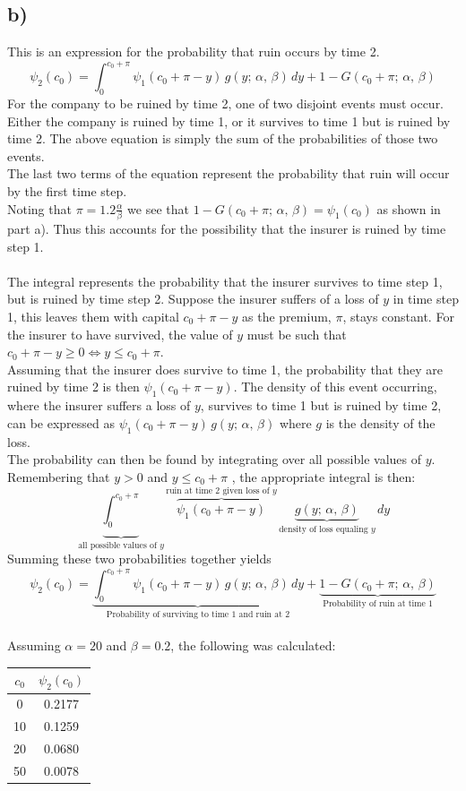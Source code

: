 \documentclass[titlepage]{article}
\begin{document}
	\subsection{b)}
	This is an expression for the probability that ruin occurs by time 2.
	$$\psi_2(c_0) = \int_{0}^{c_0+\pi}\psi_1(c_0 + \pi - y)\,g(y;\,\alpha,\,\beta)\,dy + 1 - G(c_0 + \pi;\,\alpha,\,\beta)$$
	For the company to be ruined by time 2, one of two disjoint events must occur. Either the company is ruined by time 1, or it survives to time 1 but is ruined by time 2. The above equation is simply the sum of the probabilities of those two events.\\
	The last two terms of the equation represent the probability that ruin will occur by the first time step.\\
	Noting that $\pi = 1.2 \frac{\alpha}{\beta}$ we see that $1 - G(c_0 + \pi;\,\alpha,\,\beta) = \psi_1(c_0)$ as shown in part a). Thus this accounts for the possibility that the insurer is ruined by time step 1.\\\\
	The integral represents the probability that the insurer survives to time step 1, but is ruined by time step 2. Suppose the insurer suffers of a loss of $y$ in time step 1, this leaves them with capital $c_0 + \pi - y$ as the premium, $\pi$, stays constant. For the insurer to have survived, the value of $y$ must be such that $c_0 + \pi - y \geq 0 \Leftrightarrow y \leq c_0 + \pi$.\\
	Assuming that the insurer does survive to time 1, the probability that they are ruined by time 2 is then $\psi_1(c_0 + \pi - y)$. The density of this event occurring, where the insurer suffers a loss of $y$, survives to time 1 but is ruined by time 2, can be expressed as $\psi_1(c_0 + \pi -y)\, g(y;\,\alpha, \,\beta)$ where $g$ is the density of the loss.\\
	The probability can then be found by integrating over all possible values of $y$. Remembering that $y>0$ and $y\leq c_0 + \pi$ , the appropriate integral is then:
	$$\underbrace{\int_{0}^{c_0+\pi}}_\text{all possible values of $y$}\overbrace{\psi_1(c_0 + \pi - y)}^\text{ruin at time 2 given loss of $y$}\,\underbrace{g(y;\,\alpha,\,\beta)}_\text{density of loss equaling $y$}\,dy$$
	Summing these two probabilities together yields
		$$\psi_2(c_0) = \underbrace{\int_{0}^{c_0+\pi}\psi_1(c_0 + \pi - y)\,g(y;\,\alpha,\,\beta)\,dy}_\text{Probability of surviving to time 1 and ruin at 2} + \underbrace{1 - G(c_0 + \pi;\,\alpha,\,\beta)}_\text{Probability of ruin at time 1}$$
	\\
	Assuming $\alpha = 20$ and $\beta = 0.2$, the following was calculated:
		\begin{center}
		\begin{tabular}{ |c|c|} 
			\hline
			$c_0$ & $\psi_2(c_0)$ \\ 
			\hline
			0 &  0.2177  \\ 
			10 & 0.1259 \\ 
			20 & 0.0680 \\ 
			50 & 0.0078\\
			\hline
		\end{tabular}
	\end{center}
	
\end{document}
